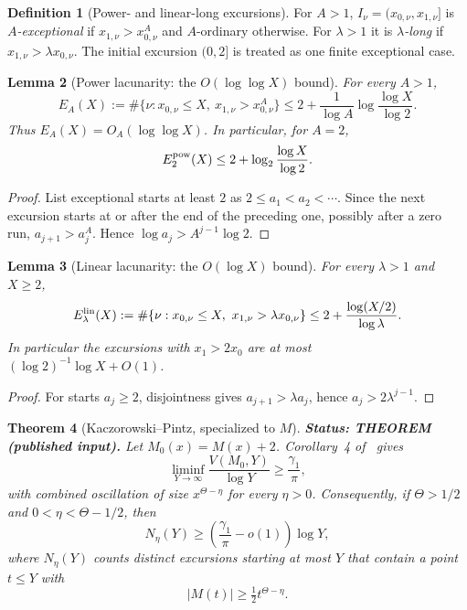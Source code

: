 \documentclass[11pt]{amsart}
\numberwithin{equation}{section}
\theoremstyle{plain}
\newtheorem{theorem}{Theorem}[section]
\newtheorem{lemma}[theorem]{Lemma}
\theoremstyle{definition}
\newtheorem{definition}[theorem]{Definition}
\theoremstyle{remark}
\begin{document}
\begin{definition}[Power- and linear-long excursions]
For $A>1$, $I_\nu=(x_{0,\nu},x_{1,\nu}]$ is \emph{$A$-exceptional} if
$x_{1,\nu}>x_{0,\nu}^A$ and $A$-ordinary otherwise. For $\lambda>1$ it is
\emph{$\lambda$-long} if $x_{1,\nu}>\lambda x_{0,\nu}$. The initial
excursion $(0,2]$ is treated as one finite exceptional case.
\end{definition}

\begin{lemma}[Power lacunarity: the $O(\log\log X)$ bound]
\label{lem:power-lacunary}
For every $A>1$,
\begin{equation}
\label{eq:power-lacunary-count}
E_A(X):=\#\{\nu:x_{0,\nu}\le X,\ x_{1,\nu}>x_{0,\nu}^A\}
\le2+\frac1{\log A}\log\frac{\log X}{\log2}.
\end{equation}
Thus $E_A(X)=O_A(\log\log X)$. In particular, for $A=2$,
\begin{equation}
\label{eq:square-exception-count}
E_2^{\rm pow}(X)\le2+\log_2\frac{\log X}{\log2}.
\end{equation}
\end{lemma}

\begin{proof}
List exceptional starts at least $2$ as $2\le a_1<a_2<\cdots$. Since the
next excursion starts at or after the end of the preceding one, possibly
after a zero run,
$a_{j+1}>a_j^A$. Hence $\log a_j>A^{j-1}\log2$.
\end{proof}

\begin{lemma}[Linear lacunarity: the $O(\log X)$ bound]
\label{lem:linear-lacunary}
For every $\lambda>1$ and $X\ge2$,
\begin{equation}
\label{eq:linear-lacunary-count}
E_\lambda^{\rm lin}(X):=
\#\{\nu:x_{0,\nu}\le X,\ x_{1,\nu}>\lambda x_{0,\nu}\}
\le2+\frac{\log(X/2)}{\log\lambda}.
\end{equation}
In particular the excursions with $x_1>2x_0$ are at most
$(\log2)^{-1}\log X+O(1)$.
\end{lemma}

\begin{proof}
For starts $a_j\ge2$, disjointness gives $a_{j+1}>\lambda a_j$, hence
$a_j>2\lambda^{j-1}$.
\end{proof}

\begin{theorem}[Kaczorowski--Pintz, specialized to $M$]
\label{thm:KP-M}
\textbf{Status: THEOREM (published input).} Let $M_0(x)=M(x)+2$. Corollary~4 of~\cite{KP86} gives
\begin{equation}
\label{eq:KP-signchanges}
\liminf_{Y\to\infty}\frac{V(M_0,Y)}{\log Y}
\ge\frac{\gamma_1}{\pi},
\end{equation}
with combined oscillation of size $x^{\Theta-\eta}$ for every $\eta>0$.
Consequently, if $\Theta>1/2$ and $0<\eta<\Theta-1/2$, then
\begin{equation}
\label{eq:KP-large-excursions}
N_\eta(Y)\ge\left(\frac{\gamma_1}{\pi}-o(1)\right)\log Y,
\end{equation}
where $N_\eta(Y)$ counts distinct excursions starting at most $Y$ that
contain a point $t\le Y$ with
\[
|M(t)|\ge\tfrac12 t^{\Theta-\eta}.
\]
\end{theorem}
\end{document}
